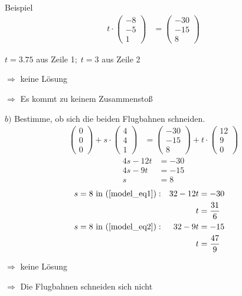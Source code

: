 \documentclass{article}
\begin{document}
\begin{boxx}[DarkBlue]{Beispiel}
\begin{align*}
            t \cdot \begin{pmatrix}-8\\-5\\1\end{pmatrix} &= \begin{pmatrix}-30\\-15\\8\end{pmatrix}
        \end{align*}
        \begin{center}
            $t=3.75$ aus Zeile 1$;\;t=3$ aus Zeile 2

            $\Rightarrow$ keine Lösung

            $\Rightarrow$ Es kommt zu keinem Zusammenstoß
        \end{center}
        $b)$\hspace{3mm} Bestimme, ob sich die beiden Flugbahnen schneiden.
        \begin{align*}
            \begin{pmatrix}0\\0\\0\end{pmatrix} + s \cdot \begin{pmatrix}4\\4\\1\end{pmatrix} &=  \begin{pmatrix}-30\\-15\\8\end{pmatrix} + t \cdot \begin{pmatrix}12\\9\\0\end{pmatrix}
        \end{align*}
        \begin{align}
            4s-12t &= -30 \label{model_eq1}\\
            4s-9t &= -15 \label{model_eq2}\\
            s &= 8 \label{model_eq3}
        \end{align}
        \begin{align*}
            &&&&&&& s = 8 \text{ in (\ref{model_eq1})}:& 32-12t &= -30 &&&&&&&&\\
            &&&&&&& & t &=\frac{31}{6} \\
            &&&&&&& s = 8 \text{ in (\ref{model_eq2})}:& 32-9t &= -15 \\
            &&&&&&& & t &=\frac{47}{9} 
        \end{align*}
        \begin{center}
            $\Rightarrow$ keine Lösung

            $\Rightarrow$ Die Flugbahnen schneiden sich nicht
        \end{center}
    \end{boxx}
\end{document}

